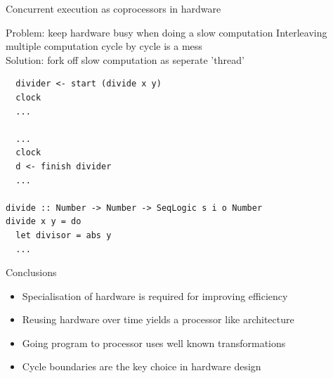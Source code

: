 \documentclass[pdf]{beamer}
\begin{document}

\begin{frame}[fragile]{Concurrent execution as coprocessors in hardware}
\begin{block}{Problem: keep hardware busy when doing a slow computation}
Interleaving multiple computation cycle by cycle is a mess \\
Solution: fork off slow computation as seperate 'thread'
\end{block}

\begin{block}{}
\begin{small}
\begin{verbatim}
  divider <- start (divide x y)
  clock
  ...
  
  ...
  clock
  d <- finish divider
  ...

divide :: Number -> Number -> SeqLogic s i o Number
divide x y = do
  let divisor = abs y
  ...
\end{verbatim}
\end{small}
\end{block}

\end{frame}

\begin{frame}{Conclusions}

\begin{itemize}
\item Specialisation of hardware is required for improving efficiency
\item Reusing hardware over time yields a processor like architecture
\item Going program to processor uses well known transformations
\item Cycle boundaries are the key choice in hardware design
\end{itemize}

\end{frame}
\end{document}

